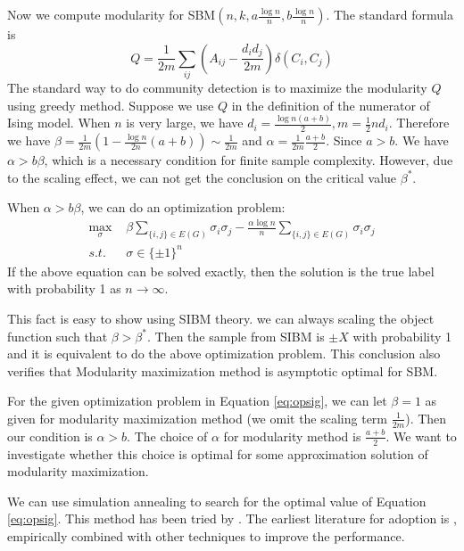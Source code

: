 \documentclass{ctexart}
\begin{document}
	Now we compute modularity for SBM$(n,k, a\frac{\log n}{n}, b\frac{\log n}{n})$.
	The standard formula is
	\begin{equation}
	Q = \frac{1}{2m} \sum_{ij} (A_{ij} - \frac{d_i d_j}{2m}) \delta(C_i, C_j)
	\end{equation}
	The standard way to do community detection is to maximize the modularity $Q$ using greedy method.
	Suppose we use $Q$ in the definition of the numerator of Ising model. When $n$ is very large,
	we have $d_i = \frac{\log n(a+b)}{2}, m = \frac{1}{2}n d_i$. Therefore we have $\beta = \frac{1}{2m}(1-\frac{\log n}{2n}(a+b))
	\sim \frac{1}{2m}$
	and $\alpha = \frac{1}{2m}\frac{a+b}{2}$. Since $a>b$. We have $\alpha > b \beta$, which is a necessary condition for finite sample complexity.
	However, due to the scaling effect, we can not get the conclusion on the critical value $\beta^*$.
	
	When $\alpha > b \beta$, we can do an optimization problem:
	\begin{align}\label{eq:opsig}
	\max_{\sigma} \,\,& \beta \sum_{\{i,j\} \in E(G)} \sigma_i \sigma_j - \frac{\alpha \log n}{n} \sum_{\{i,j\} \in E(G)} \sigma_i \sigma_j\\
	s.t. \,\, & \sigma \in \{\pm 1\}^n
	\end{align}
	If the above equation can be solved exactly, then the solution is the true label with probability 1 as $n\to \infty$.
	
	This fact is easy to show using SIBM theory. we can always scaling the object function such that $\beta > \beta^*$.
	Then the sample from SIBM is $\pm X$ with probability 1 and it is equivalent to do the above optimization problem.
	This conclusion also verifies that Modularity maximization method is asymptotic optimal for SBM.
	
	For the given optimization problem in Equation \eqref{eq:opsig}, we can let $\beta = 1$ as given for modularity maximization method (we omit the scaling term $\frac{1}{2m}$).
	Then our condition is $\alpha > b$. The choice of $\alpha$ for modularity method is $\frac{a+b}{2}$. We want to
	investigate whether this choice is optimal for some approximation solution of modularity maximization.
	
	We can use simulation annealing to search for the optimal value of Equation \eqref{eq:opsig}. This method has been tried
	by \cite{he2016fast}. The earliest literature for adoption is \cite{liu2010detecting}, empirically combined with other techniques to improve
	the performance.
\end{document}
